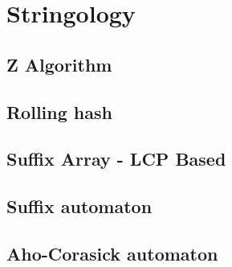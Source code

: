 \section{Stringology}

\subsection{Z Algorithm} 




%

\subsection{Rolling hash}



%

\subsection{Suffix Array - LCP Based}



\subsection{Suffix automaton}


\subsection{Aho-Corasick automaton}

